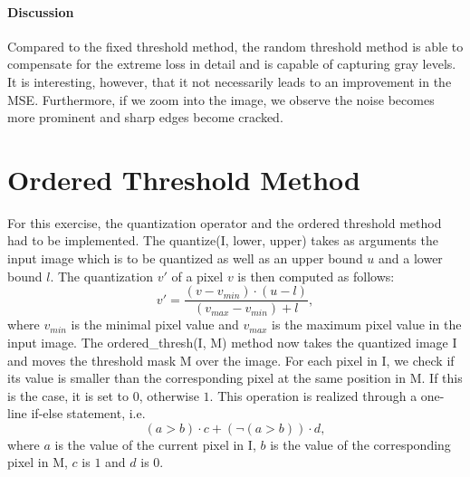 \documentclass{article}
\begin{document}
\paragraph{Discussion}
Compared to the fixed threshold method, the random threshold method is able to compensate for the extreme loss in detail and is capable of capturing gray levels. It is interesting, however, that it not necessarily leads to an improvement in the MSE. Furthermore, if we zoom into the image, we observe the noise becomes more prominent and sharp edges become cracked.

\section{Ordered Threshold Method}
For this exercise, the quantization operator and the ordered threshold method had to be implemented. The \textsf{quantize(I, lower, upper)} takes as arguments the input image which is to be quantized as well as an upper bound $u$ and a lower bound $l$. The quantization $v'$ of a pixel $v$ is then computed as follows:
\begin{equation*}
    v' = \frac{(v - v_{min}) \cdot (u - l)}{(v_{max} - v_{min}) + l},
\end{equation*}
where $v_{min}$ is the minimal pixel value and $v_{max}$ is the maximum pixel value in the input image. The \textsf{ordered\_thresh(I, M)} method now takes the quantized image \textsf{I} and moves the threshold mask \textsf{M} over the image. For each pixel in \textsf{I}, we check if its value is smaller than the corresponding pixel at the same position in \textsf{M}. If this is the case, it is set to $0$, otherwise $1$. This operation is realized through a one-line \textsf{if-else} statement, i.e.
\begin{equation*}
    (a > b) \cdot c + (\neg(a > b)) \cdot d,
\end{equation*}
where $a$ is the value of the current pixel in \textsf{I}, $b$ is the value of the corresponding pixel in \textsf{M}, $c$ is $1$ and $d$ is $0$.
\end{document}
